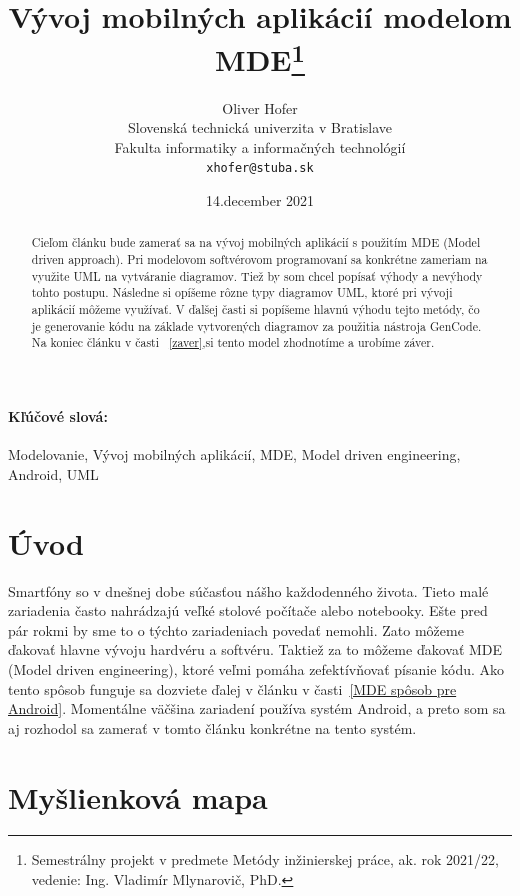 \documentclass[10pt,twoside,slovak,a4paper]{article}
\title{Vývoj mobilných aplikácií modelom MDE\thanks{Semestrálny projekt v predmete Metódy inžinierskej práce, ak. rok 2021/22, vedenie: Ing. Vladimír Mlynarovič, PhD.}} %
\author{Oliver Hofer\\[2pt]
	{\small Slovenská technická univerzita v Bratislave}\\
	{\small Fakulta informatiky a informačných technológií}\\
	{\small \texttt{xhofer@stuba.sk}}
	}
\date{\small 14.december  2021} %
\begin{document}
\maketitle

\begin{abstract}
Cieľom článku bude zamerať sa na vývoj mobilných aplikácií s použitím MDE (Model driven approach). Pri modelovom softvérovom programovaní sa konkrétne zameriam na využite UML na vytváranie diagramov. Tiež by som chcel popísať výhody a nevýhody tohto postupu. Následne si opíšeme rôzne typy diagramov UML, ktoré pri vývoji aplikácií môžeme využívať. V ďalšej časti si popíšeme hlavnú výhodu tejto metódy, čo je generovanie kódu na základe vytvorených diagramov za použitia nástroja GenCode. Na koniec článku v časti ~\ref{zaver},si tento model zhodnotíme a urobíme záver.
\end{abstract}
\paragraph{Kľúčové slová:} Modelovanie, Vývoj mobilných aplikácií, MDE, Model driven engineering, Android, UML


\section{Úvod}

Smartfóny so v dnešnej dobe súčasťou nášho každodenného života. Tieto malé zariadenia často nahrádzajú veľké stolové počítače alebo notebooky. Ešte pred pár rokmi by sme to o týchto zariadeniach povedať nemohli. Zato môžeme ďakovať hlavne vývoju hardvéru a softvéru. \newline
Taktiež za to môžeme ďakovať MDE (Model driven engineering), ktoré veľmi pomáha zefektívňovať písanie kódu. Ako tento spôsob funguje sa dozviete ďalej v článku v časti~\ref{MDE spôsob pre Android}.\newline
Momentálne väčšina zariadení používa systém Android, a preto som sa aj rozhodol sa zamerať v tomto článku konkrétne na tento systém.

\newpage
\section{Myšlienková mapa} \label{Myšlienková mapa}
\end{document}
